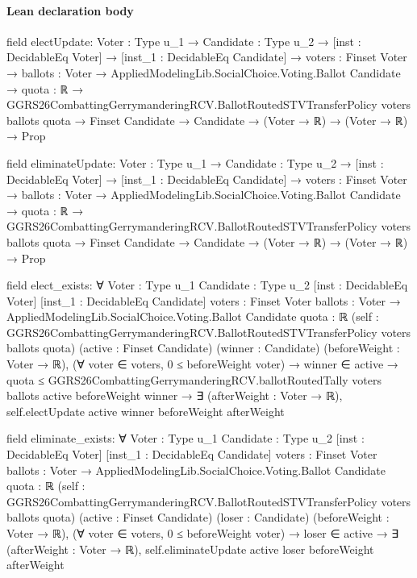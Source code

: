 \documentclass[10pt]{article}
\begin{document}
\paragraph{Lean declaration body}
\begin{ReviewVerbatim}
field electUpdate:
{Voter : Type u_1} →
  {Candidate : Type u_2} →
    [inst : DecidableEq Voter] →
      [inst_1 : DecidableEq Candidate] →
        {voters : Finset Voter} →
          {ballots : Voter → AppliedModelingLib.SocialChoice.Voting.Ballot Candidate} →
            {quota : ℝ} →
              GGRS26CombattingGerrymanderingRCV.BallotRoutedSTVTransferPolicy voters ballots quota →
                Finset Candidate → Candidate → (Voter → ℝ) → (Voter → ℝ) → Prop

field eliminateUpdate:
{Voter : Type u_1} →
  {Candidate : Type u_2} →
    [inst : DecidableEq Voter] →
      [inst_1 : DecidableEq Candidate] →
        {voters : Finset Voter} →
          {ballots : Voter → AppliedModelingLib.SocialChoice.Voting.Ballot Candidate} →
            {quota : ℝ} →
              GGRS26CombattingGerrymanderingRCV.BallotRoutedSTVTransferPolicy voters ballots quota →
                Finset Candidate → Candidate → (Voter → ℝ) → (Voter → ℝ) → Prop

field elect_exists:
∀ {Voter : Type u_1} {Candidate : Type u_2} [inst : DecidableEq Voter] [inst_1 : DecidableEq Candidate]
  {voters : Finset Voter} {ballots : Voter → AppliedModelingLib.SocialChoice.Voting.Ballot Candidate} {quota : ℝ}
  (self : GGRS26CombattingGerrymanderingRCV.BallotRoutedSTVTransferPolicy voters ballots quota)
  (active : Finset Candidate) (winner : Candidate) (beforeWeight : Voter → ℝ),
  (∀ voter ∈ voters, 0 ≤ beforeWeight voter) →
    winner ∈ active →
      quota ≤ GGRS26CombattingGerrymanderingRCV.ballotRoutedTally voters ballots active beforeWeight winner →
        ∃ (afterWeight : Voter → ℝ), self.electUpdate active winner beforeWeight afterWeight

field eliminate_exists:
∀ {Voter : Type u_1} {Candidate : Type u_2} [inst : DecidableEq Voter] [inst_1 : DecidableEq Candidate]
  {voters : Finset Voter} {ballots : Voter → AppliedModelingLib.SocialChoice.Voting.Ballot Candidate} {quota : ℝ}
  (self : GGRS26CombattingGerrymanderingRCV.BallotRoutedSTVTransferPolicy voters ballots quota)
  (active : Finset Candidate) (loser : Candidate) (beforeWeight : Voter → ℝ),
  (∀ voter ∈ voters, 0 ≤ beforeWeight voter) →
    loser ∈ active → ∃ (afterWeight : Voter → ℝ), self.eliminateUpdate active loser beforeWeight afterWeight


\end{ReviewVerbatim}
\end{document}
